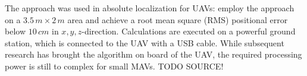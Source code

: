 The approach was used in absolute localization for UAVs: \citet{blosch2010vision} employ the approach on a $3.5\,m \times 2\,m$ area and achieve a root mean square (RMS) positional error below $10\,cm$ in $x,y,z$-direction. Calculations are executed on a powerful ground station, which is connected to the UAV with a USB cable. While subsequent research has brought the algorithm on board of the UAV, the required processing power is still to complex for small MAVs. TODO SOURCE!  